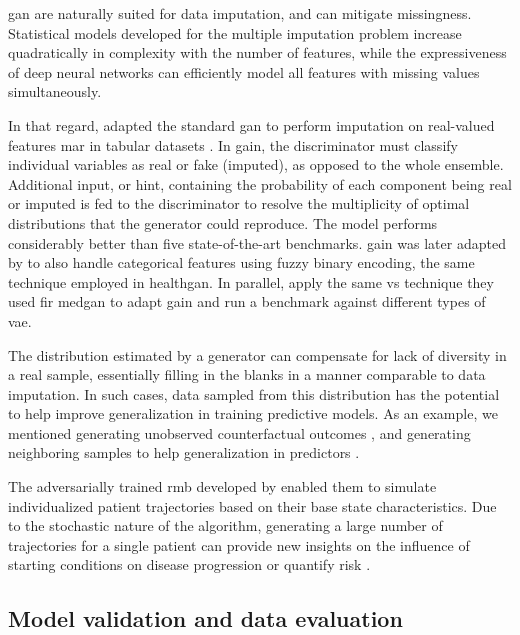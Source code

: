         \gls{gan} are naturally suited for data imputation, and can mitigate missingness. Statistical models developed for the multiple imputation problem increase quadratically in complexity with the number of features, while the expressiveness of deep neural networks can efficiently model all features with missing values simultaneously.\par
        In that regard, \citeauthor{yoon2018imputation} adapted the standard \gls{gan} to perform imputation on real-valued features \gls{mar} in tabular datasets \cite{yoon2018imputation}. In \gls{gain}, the discriminator must classify individual variables as real or fake (imputed), as opposed to the whole ensemble. Additional input, or hint, containing the probability of each component being real or imputed is fed to the discriminator to resolve the multiplicity of optimal distributions that the generator could reproduce. The model performs considerably better than five state-of-the-art benchmarks. \gls{gain} was later adapted by \citeauthor{Yang_2019_impute_ehr} to also handle categorical features using fuzzy binary encoding, the same technique employed in \gls{healthgan}. In parallel, \citeauthor{Camino2019} apply the same \gls{vs} technique they used fir \gls{medgan} to adapt \gls{gain} and run a benchmark against different types of \gls{vae}.\par
    
        The distribution estimated by a generator can compensate for lack of diversity in a real sample, essentially filling in the blanks in a manner comparable to data imputation. In such cases, data sampled from this distribution has the potential to help improve generalization in training predictive models. As an example, we mentioned generating unobserved counterfactual outcomes \cite{yoon2018imputation}, and generating neighboring samples to help generalization in predictors \cite{Che_2017}.\par 
        The adversarially trained \gls{rmb} developed by \citeauthor{Fisher2019} enabled them to simulate individualized patient trajectories based on their base state characteristics. Due to the stochastic nature of the algorithm, generating a large number of trajectories for a single patient can provide new insights on the influence of starting conditions on disease progression or quantify risk \cite{Fisher2019}.
        
    \subsection{Model validation and data evaluation}
    
